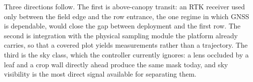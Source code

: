 \documentclass[conference]{IEEEtran}
\begin{document}
Three directions follow. The first is above-canopy transit: an RTK receiver used
only between the field edge and the row entrance, the one regime in which GNSS
is dependable, would close the gap between deployment and the first row. The
second is integration with the physical sampling module the platform already
carries, so that a covered plot yields measurements rather than a trajectory.
The third is the sky class, which the controller currently ignores: a lens
occluded by a leaf and a crop wall directly ahead produce the same mask today,
and sky visibility is the most direct signal available for separating them.

\end{document}

